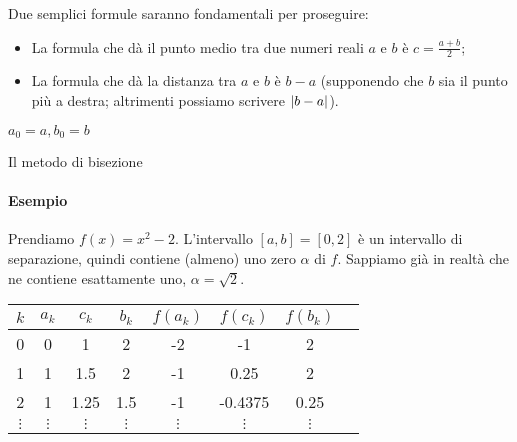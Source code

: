 \documentclass[a4paper]{report}
\DeclarePairedDelimiter{\abs}{\lvert}{\rvert}
\theoremstyle{definiton}
\theoremstyle{remark}
\begin{document}
Due semplici formule saranno fondamentali per proseguire:
\begin{itemize}
    \item La formula che dà il punto medio tra due numeri reali $a$ e $b$ è $c = \frac{a+b}{2}$;
    \item La formula che dà la distanza tra $a$ e $b$ è $b-a$ (supponendo che $b$ sia il punto più a destra; altrimenti possiamo scrivere $\abs{b-a}$).
\end{itemize}
\begin{center}
\end{center}


\begin{algorithm}
$a_0=a,b_0=b$\;
\caption{Il metodo di bisezione}
\end{algorithm}

\paragraph{Esempio} Prendiamo $f(x) = x^2 - 2$. L'intervallo $[a,b] = [0,2]$ è un intervallo di separazione, quindi contiene (almeno) uno zero $\alpha$ di $f$. Sappiamo già in realtà che ne contiene esattamente uno, $\alpha=\sqrt{2}$.

\begin{center}
    \begin{tabular}{cccccccc}
        \toprule
        $k$ & $a_k$ & $c_k$ & $b_k$ & $f(a_k)$ & $f(c_k)$ & $f(b_k)$\\
        \midrule
        0 & 0 & 1 & 2 & -2 & -1 & 2\\
        1 & 1 & 1.5 & 2 & -1 & 0.25 & 2\\
        2 & 1 & 1.25 & 1.5 & -1 & -0.4375 & 0.25\\
        $\vdots$ & $\vdots$ & $\vdots$ & $\vdots$ & $\vdots$ & $\vdots$ &$\vdots$ \\
        \bottomrule
    \end{tabular}
\end{center}
\end{document}

